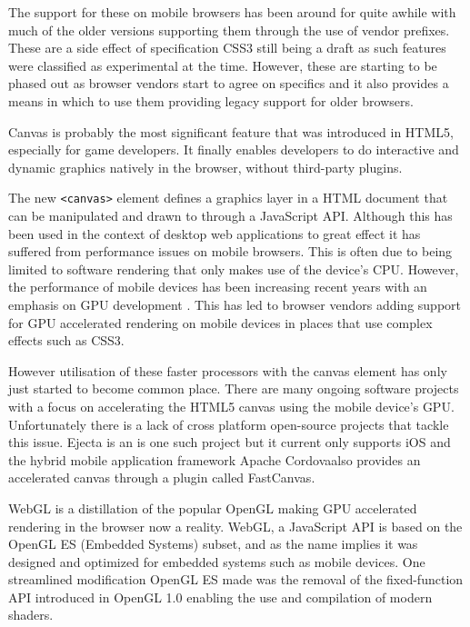 \documentclass[final]{cmpreport}
\begin{document}
The support for these on mobile browsers has been around for quite awhile with much of the older versions supporting them through the use of vendor prefixes. These are a side effect of specification CSS3 still being a draft as such features were classified as experimental at the time. However, these are starting to be phased out as browser vendors start to agree on specifics and it also provides a means in which to use them providing legacy support for older browsers.

Canvas is probably the most significant feature that was introduced in HTML5, especially for game developers. It finally enables developers to do interactive and dynamic graphics natively in the browser, without third-party plugins.

The new \texttt{<canvas>} element defines a graphics layer in a HTML document that can be manipulated and drawn to through a JavaScript API. Although this has been used in the context of desktop web applications to great effect it has suffered from performance issues on mobile browsers. This is often due to being limited to software rendering that only makes use of the device's CPU. However, the performance of mobile devices has been increasing recent years with an emphasis on GPU development \cite{Lin}. This has led to browser vendors adding support for GPU accelerated rendering on mobile devices in places that use complex effects such as CSS3.

However utilisation of these faster processors with the canvas element has only just started to become common place. There are many ongoing software projects with a focus on accelerating the HTML5 canvas using the mobile device's GPU. Unfortunately there is a lack of cross platform open-source projects that tackle this issue. Ejecta is an is one such project but it current only supports iOS and the hybrid mobile application framework Apache Cordova\footnotemark also provides an accelerated canvas through a plugin called FastCanvas\footnotemark.


WebGL is a distillation of the popular OpenGL making GPU accelerated rendering in the browser now a reality. WebGL, a JavaScript API is based on the OpenGL ES (Embedded Systems) subset, and as the name implies it was designed and optimized for embedded systems such as mobile devices. One streamlined modification OpenGL ES made was the removal of the fixed-function API introduced in OpenGL 1.0 enabling the use and compilation of modern shaders.
\end{document}
